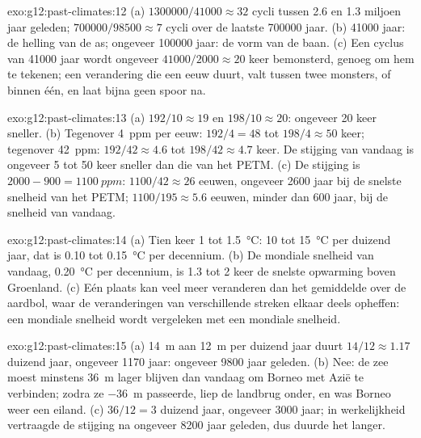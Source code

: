 \begin{solution}{exo:g12:past-climates:12}
(a) $\num{1300000}/\num{41000} \approx 32$ cycli tussen 2.6 en 1.3
miljoen jaar geleden; $\num{700000}/\num{98500} \approx 7$ cycli over de laatste
\num{700000} jaar. (b) \num{41000} jaar: de helling van de as; ongeveer
\num{100000} jaar: de vorm van de baan. (c) Een cyclus van \num{41000} jaar
wordt ongeveer $\num{41000}/\num{2000} \approx 20$ keer bemonsterd, genoeg om hem te tekenen;
een verandering die een eeuw duurt, valt tussen twee monsters, of binnen één, en
laat bijna geen spoor na.
\end{solution}

\begin{solution}{exo:g12:past-climates:13}
(a) $192/10 \approx 19$ en $198/10 \approx 20$: ongeveer 20 keer sneller.
(b) Tegenover \qty{4}{ppm} per eeuw: $192/4 = 48$ tot $198/4 \approx 50$
keer; tegenover \qty{42}{ppm}: $192/42 \approx 4.6$ tot $198/42 \approx 4.7$
keer. De stijging van vandaag is ongeveer 5 tot 50 keer sneller dan die van het PETM.
(c) De stijging is $2000 - 900 = \qty{1100}{ppm}$: $1100/42 \approx 26$ eeuwen,
ongeveer \num{2600} jaar bij de snelste snelheid van het PETM; $1100/195 \approx 5.6$
eeuwen, minder dan 600 jaar, bij de snelheid van vandaag.
\end{solution}

\begin{solution}{exo:g12:past-climates:14}
(a) Tien keer 1 tot \qty{1.5}{\degreeCelsius}: 10 tot \qty{15}{\degreeCelsius}
per duizend jaar, dat is 0.10 tot \qty{0.15}{\degreeCelsius} per decennium.
(b) De mondiale snelheid van vandaag, \qty{0.20}{\degreeCelsius} per decennium, is 1.3 tot 2
keer de snelste opwarming boven Groenland. (c) Eén plaats kan veel
meer veranderen dan het gemiddelde over de aardbol, waar de veranderingen van verschillende streken
elkaar deels opheffen: een mondiale snelheid wordt vergeleken met een mondiale snelheid.
\end{solution}

\begin{solution}{exo:g12:past-climates:15}
(a) \qty{14}{m} aan \qty{12}{m} per duizend jaar duurt $14/12 \approx
1.17$ duizend jaar, ongeveer \num{1170} jaar: ongeveer \num{9800} jaar geleden.
(b) Nee: de zee moest minstens \qty{36}{m} lager blijven dan vandaag om
Borneo met Azië te verbinden; zodra ze \qty{-36}{m} passeerde, liep de landbrug onder, en
was Borneo weer een eiland. (c) $36/12 = 3$ duizend jaar, ongeveer
\num{3000} jaar; in werkelijkheid vertraagde de stijging na ongeveer \num{8200} jaar
geleden, dus duurde het langer.
\end{solution}


